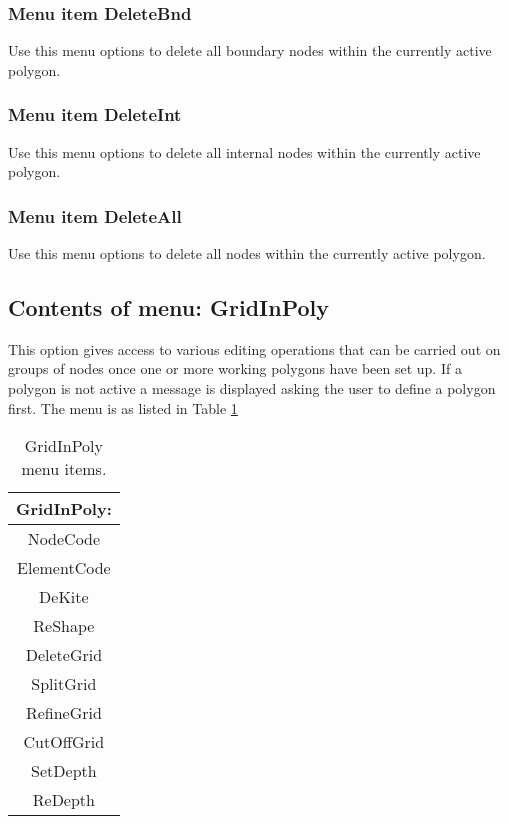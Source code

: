 \documentclass{article}
\begin{document}
\subsubsection[Menu item DeleteBnd]{Menu item DeleteBnd}

Use this menu options to delete all boundary nodes within the currently active polygon.

\subsubsection[Menu item DeleteInt]{Menu item DeleteInt}

Use this menu options to delete all internal nodes within the currently active polygon.

\subsubsection[Menu item DeleteBnd]{Menu item DeleteAll}

Use this menu options to delete all nodes within the currently active polygon.

\subsection{Contents of menu: GridInPoly}
This option gives access to various editing operations that can be carried out on groups of nodes once one or more working polygons have been set up. 
If a polygon is not active a message is displayed asking the user to define a polygon first.
The menu is as listed in Table \ref{tab:GRIDINPOLY} 

\begin{table}[htb!]
 \caption{GridInPoly menu items.}
  \begin{center}
   \begin{tabular}{|c|}
    \hline
GridInPoly:\\     \hline
NodeCode \\ ElementCode \\ DeKite \\ ReShape \\
DeleteGrid \\ SplitGrid \\ RefineGrid \\
CutOffGrid \\ SetDepth \\ ReDepth \\
    \hline
   \end{tabular}
   \label{tab:GRIDINPOLY}
  \end{center}
\end{table}
\end{document}
